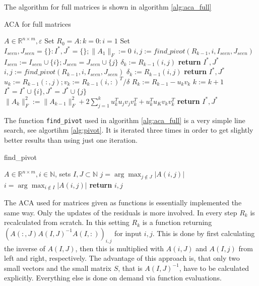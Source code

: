 \documentclass[%
a4paper,
parskip=half,
DIV=calc,
]
{scrartcl}
\newcommand{\eps}{\varepsilon}
\begin{document}
The algorithm for full matrices is shown in algorithm \ref{alg:aca_full}
\begin{algorithm}
  \caption{ACA for full matrices}
  \label{alg:aca_full}
  \begin{algorithmic}[1]
    \Require $A \in \mathbb{R}^{n \times m}, \eps$
    \State Set $R_0 = A: k=0: i=1$
    \State Set $I_{seen}, J_{seen} = \{\}: I^*,J^* = \{\}; \|A_1\|_F := 0$
    \Loop
      \State $i,j := find\_pivot(R_{k-1}, i, I_{seen}, J_{seen})$
      \State $I_{seen} := I_{seen} \cup \{i\}; J_{seen} = J_{seen} \cup \{j\}$
      \State $\delta_k := R_{k-1}(i,j)$
      \If{$| \delta | \leq \eps$}
          \State \textbf{return} $I^*, J^*$
        \EndIf
        \State $i,j := find\_pivot(R_{k-1}, i, I_{seen}, J_{seen})$
        \State $\delta_k := R_{k-1}(i,j)$
        \If{$| \delta | \leq \eps$}
            \State \textbf{return} $I^*, J^*$
          \EndIf
        \EndIf
      \Else
        \State $u_k := R_{k-1}(:,j); v_k := R_{k-1}(i,:)^T/\delta$
        \State $R_k := R_{k-1} - u_k v_k$
        \State $k := k+1$
        \State $I^* = I^* \cup \{i\}, J^* = J^* \cup \{j\}$
        \State $\| A_{k} \|_F^2 := \| A_{k-1} \|_F^2 + 2\sum_{j=1}^k u_k^T u_j v_j v_k^T + u_k^T u_K v_k v_k^T$
        \If{$u_k^T u_k v_k v_k^T \leq \eps \| A_{k} \|_F^2$ or $k=\min(n,m)$}
          \State \textbf{return} $I^*, J^*$
        \EndIf
      \EndIf
    \EndLoop
  \end{algorithmic}
\end{algorithm}
The function \texttt{find\_pivot} used in algorithm \ref{alg:aca_full}
is a very simple line search, see algortihm \ref{alg:pivot}. It is
iterated three times in order to get slightly better results than
using just one iteration.
\begin{algorithm}
  \caption{find\_pivot}
  \label{alg:pivot}
  \begin{algorithmic}[1]
    \Require $A \in \mathbb{R}^{n \times m}, i \in \mathbb{N}$, sets $I, J \subset \mathbb{N}$
      \State $j = \arg\max_{j \notin J} |A(i,j)|$
      \State $i = \arg\max_{i \notin I} |A(i,j)|$
    \EndFor
    \State \textbf{return} $i, j$
  \end{algorithmic}
\end{algorithm}

The ACA used for matrices given as functions is essentially
implemented the same way.  Only the updates of the residuals is more
involved.  In every step $R_k$ is recalculated from scratch.  In this
setting $R_k$ is a function returning
$(A(:,J)A(I,J)^{-1}A(I,:))_{i,j}$ for input $i, j$.  This is done by
first calculating the inverse of $A(I,J)$, then this is multiplied
with $A(i,J)$ and $A(I,j)$ from left and right, respectively.  The
advantage of this approach is, that only two small vectors and the
small matrix $S$, that is $A(I,J)^{-1}$, have to be calculated
explicitly.  Everything else is done on demand via function
evaluations.
\end{document}
